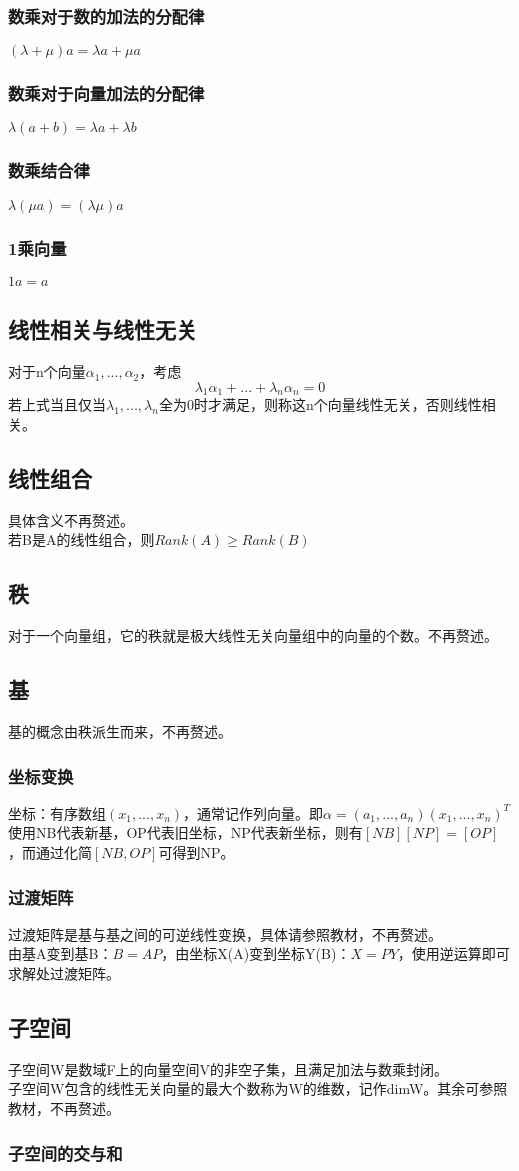 \documentclass[UTF8]{ctexart}
\begin{document}
    \subsubsection{数乘对于数的加法的分配律}$(\lambda+\mu)a=\lambda a+\mu a$
    \subsubsection{数乘对于向量加法的分配律}$\lambda(a+b)=\lambda a+\lambda b$
    \subsubsection{数乘结合律}$\lambda(\mu a)=(\lambda \mu)a$
    \subsubsection{1乘向量}$1a=a$
    \subsection{线性相关与线性无关}
    对于n个向量$\alpha_1,...,\alpha_2$，考虑
    \[\displaystyle \lambda_1\alpha_1+...+\lambda_n\alpha_n=0\]
    \indent
    若上式当且仅当$\lambda_1,...,\lambda_n$全为0时才满足，则称这n个向量线性无关，否则线性相关。
    \subsection{线性组合}
    具体含义不再赘述。\\
    \indent
    若B是A的线性组合，则$Rank(A)\geq Rank(B)$
    \subsection{秩}
    对于一个向量组，它的秩就是极大线性无关向量组中的向量的个数。不再赘述。
    \subsection{基}
    基的概念由秩派生而来，不再赘述。
    \subsubsection{坐标变换}
    坐标：有序数组$(x_1,...,x_n)$，通常记作列向量。即$\alpha=(a_1,...,a_n)(x_1,...,x_n)^T$\\
    \indent
    使用NB代表新基，OP代表旧坐标，NP代表新坐标，则有$[NB][NP]=[OP]$，而通过化简$[NB,OP]$可得到NP。
    \subsubsection{过渡矩阵}
    过渡矩阵是基与基之间的可逆线性变换，具体请参照教材，不再赘述。\\
    \indent
    由基A变到基B：$B=AP$，由坐标X(A)变到坐标Y(B)：$X=PY$，使用逆运算即可求解处过渡矩阵。
    \subsection{子空间}
    子空间W是数域F上的向量空间V的非空子集，且满足加法与数乘封闭。\\
    \indent
    子空间W包含的线性无关向量的最大个数称为W的维数，记作dimW。其余可参照教材，不再赘述。
    \subsubsection{子空间的交与和}
\end{document}
